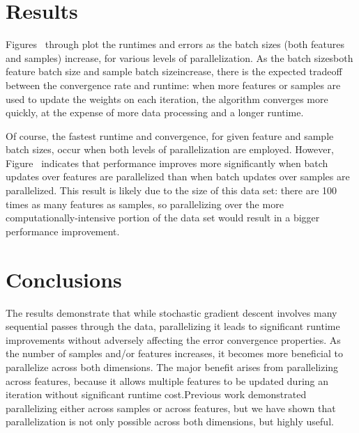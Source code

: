\documentclass{article}
\begin{document}
\section{Results}


Figures~\cite{fig:NAME1} through \cite{fig:NAMEn} plot the runtimes and errors as the batch sizes (both features and samples) increase, for various levels of parallelization. As the batch sizes\textemdash both feature batch size and sample batch size\textemdash increase, there is the expected tradeoff between the convergence rate and runtime: when more features or samples are used to update the weights on each iteration, the algorithm converges more quickly, at the expense of more data processing and a longer runtime.

Of course, the fastest runtime and convergence, for given feature and sample batch sizes, occur when both levels of parallelization are employed. However, Figure~\cite{fig:NAME} indicates that performance improves more significantly when batch updates over features are parallelized than when batch updates over samples are parallelized. This result is likely due to the size of this data set: there are 100 times as many features as samples, so parallelizing over the more computationally-intensive portion of the data set would result in a bigger performance improvement.

\section{Conclusions}
The results demonstrate that while stochastic gradient descent involves many sequential passes through the data, parallelizing it leads to significant runtime improvements without adversely affecting the error convergence properties.  As the number of samples and/or features increases, it becomes more beneficial to parallelize across both dimensions.  The major benefit arises from parallelizing across features, because it allows multiple features to be updated during an iteration without significant runtime cost.Previous work demonstrated parallelizing either across samples or across features, but we have shown that parallelization is not only possible across both dimensions, but highly useful.



\end{document}
